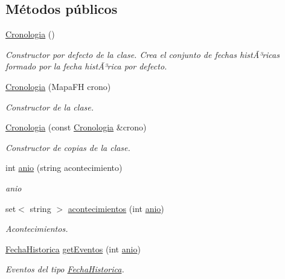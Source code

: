 \subsection*{Métodos públicos}
\begin{DoxyCompactItemize}
\item 
\mbox{\label{classCronologia_ac0026b1919148f6cd6cf4ca4c357771e}} 
\hyperlink{classCronologia_ac0026b1919148f6cd6cf4ca4c357771e}{Cronologia} ()
\begin{DoxyCompactList}\small\item\em Constructor por defecto de la clase. Crea el conjunto de fechas histÃ³ricas formado por la fecha histÃ³rica por defecto. \end{DoxyCompactList}\item 
\hyperlink{classCronologia_ab338ac4b9270cfc162c7220ee99578c9}{Cronologia} (Mapa\+FH crono)
\begin{DoxyCompactList}\small\item\em Constructor de la clase. \end{DoxyCompactList}\item 
\hyperlink{classCronologia_a0d102db0ec0c1d8a9ecb31cca7978ffe}{Cronologia} (const \hyperlink{classCronologia}{Cronologia} \&crono)
\begin{DoxyCompactList}\small\item\em Constructor de copias de la clase. \end{DoxyCompactList}\item 
int \hyperlink{classCronologia_a5412d39f8e20dd2a178eaed3a2c660fc}{anio} (string acontecimiento)
\begin{DoxyCompactList}\small\item\em anio \end{DoxyCompactList}\item 
set$<$ string $>$ \hyperlink{classCronologia_a58cfb3b166f4af26c8a66ea63d163a22}{acontecimientos} (int \hyperlink{classCronologia_a5412d39f8e20dd2a178eaed3a2c660fc}{anio})
\begin{DoxyCompactList}\small\item\em Acontecimientos. \end{DoxyCompactList}\item 
\hyperlink{classFechaHistorica}{Fecha\+Historica} \hyperlink{classCronologia_a45780b1afa95d9c0ca0c4cdd72180114}{get\+Eventos} (int \hyperlink{classCronologia_a5412d39f8e20dd2a178eaed3a2c660fc}{anio})
\begin{DoxyCompactList}\small\item\em Eventos del tipo \hyperlink{classFechaHistorica}{Fecha\+Historica}. \end{DoxyCompactList}\item 

\end{DoxyCompactItemize}
